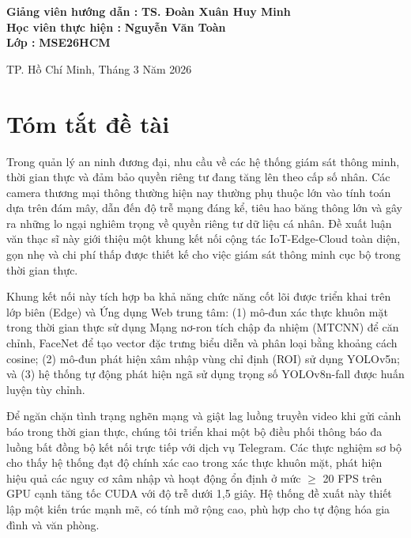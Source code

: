 \documentclass[12pt,a4paper]{article}
\begin{document}
\begin{titlepage}
\begin{center}
        \begin{flushright}
            \textbf{Giảng viên hướng dẫn :} \textbf{TS. Đoàn Xuân Huy Minh} \\
            \vspace{0.5cm}
            \textbf{Học viên thực hiện : } \textbf{Nguyễn Văn Toàn} \\
            \vspace{0.5cm}
            \textbf{Lớp :} \textbf{MSE26HCM}
        \end{flushright}
        
        \vfill
        TP. Hồ Chí Minh, Tháng 3 Năm 2026
    \end{center}
\end{titlepage}
\hypersetup{pageanchor=true}

\newpage

\section*{Tóm tắt đề tài}
Trong quản lý an ninh đương đại, nhu cầu về các hệ thống giám sát thông minh, thời gian thực và đảm bảo quyền riêng tư đang tăng lên theo cấp số nhân. Các camera thương mại thông thường hiện nay thường phụ thuộc lớn vào tính toán dựa trên đám mây, dẫn đến độ trễ mạng đáng kể, tiêu hao băng thông lớn và gây ra những lo ngại nghiêm trọng về quyền riêng tư dữ liệu cá nhân. Đề xuất luận văn thạc sĩ này giới thiệu một khung kết nối cộng tác IoT-Edge-Cloud toàn diện, gọn nhẹ và chi phí thấp được thiết kế cho việc giám sát thông minh cục bộ trong thời gian thực.

Khung kết nối này tích hợp ba khả năng chức năng cốt lõi được triển khai trên lớp biên (Edge) và Ứng dụng Web trung tâm: (1) mô-đun xác thực khuôn mặt trong thời gian thực sử dụng Mạng nơ-ron tích chập đa nhiệm (MTCNN) để căn chỉnh, FaceNet để tạo vector đặc trưng biểu diễn và phân loại bằng khoảng cách cosine; (2) mô-đun phát hiện xâm nhập vùng chỉ định (ROI) sử dụng YOLOv5n; và (3) hệ thống tự động phát hiện ngã sử dụng trọng số YOLOv8n-fall được huấn luyện tùy chỉnh.

Để ngăn chặn tình trạng nghẽn mạng và giật lag luồng truyền video khi gửi cảnh báo trong thời gian thực, chúng tôi triển khai một bộ điều phối thông báo đa luồng bất đồng bộ kết nối trực tiếp với dịch vụ Telegram. Các thực nghiệm sơ bộ cho thấy hệ thống đạt độ chính xác cao trong xác thực khuôn mặt, phát hiện hiệu quả các nguy cơ xâm nhập và hoạt động ổn định ở mức $\ge$ 20 FPS trên GPU cạnh tăng tốc CUDA với độ trễ dưới 1,5 giây. Hệ thống đề xuất này thiết lập một kiến trúc mạnh mẽ, có tính mở rộng cao, phù hợp cho tự động hóa gia đình và văn phòng.
\end{document}

